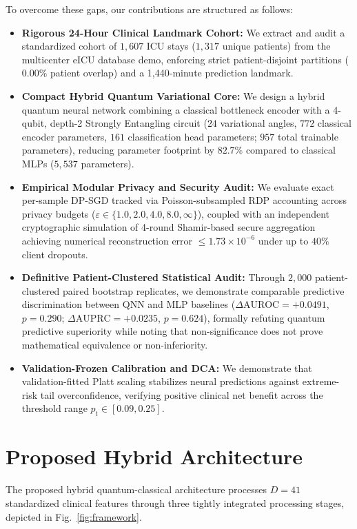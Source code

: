 \documentclass[conference]{IEEEtran}
\begin{document}
To overcome these gaps, our contributions are structured as follows:
\begin{itemize}
    \item \textbf{Rigorous 24-Hour Clinical Landmark Cohort:} We extract and audit a standardized cohort of $1,607$ ICU stays ($1,317$ unique patients) from the multicenter eICU database demo, enforcing strict patient-disjoint partitions ($0.00\%$ patient overlap) and a 1,440-minute prediction landmark.
    \item \textbf{Compact Hybrid Quantum Variational Core:} We design a hybrid quantum neural network combining a classical bottleneck encoder with a 4-qubit, depth-2 Strongly Entangling circuit ($24$ variational angles, $772$ classical encoder parameters, $161$ classification head parameters; $957$ total trainable parameters), reducing parameter footprint by $82.7\%$ compared to classical MLPs ($5,537$ parameters).
    \item \textbf{Empirical Modular Privacy and Security Audit:} We evaluate exact per-sample DP-SGD tracked via Poisson-subsampled RDP accounting across privacy budgets ($\varepsilon \in \{1.0, 2.0, 4.0, 8.0, \infty\}$), coupled with an independent cryptographic simulation of 4-round Shamir-based secure aggregation achieving numerical reconstruction error $\le 1.73 \times 10^{-6}$ under up to $40\%$ client dropouts.
    \item \textbf{Definitive Patient-Clustered Statistical Audit:} Through $2,000$ patient-clustered paired bootstrap replicates, we demonstrate comparable predictive discrimination between QNN and MLP baselines ($\Delta\text{AUROC} = +0.0491$, $p = 0.290$; $\Delta\text{AUPRC} = +0.0235$, $p = 0.624$), formally refuting quantum predictive superiority while noting that non-significance does not prove mathematical equivalence or non-inferiority.
    \item \textbf{Validation-Frozen Calibration and DCA:} We demonstrate that validation-fitted Platt scaling stabilizes neural predictions against extreme-risk tail overconfidence, verifying positive clinical net benefit across the threshold range $p_t \in [0.09, 0.25]$.
\end{itemize}

\section{Proposed Hybrid Architecture}
The proposed hybrid quantum-classical architecture processes $D = 41$ standardized clinical features through three tightly integrated processing stages, depicted in Fig.~\ref{fig:framework}.
\end{document}

